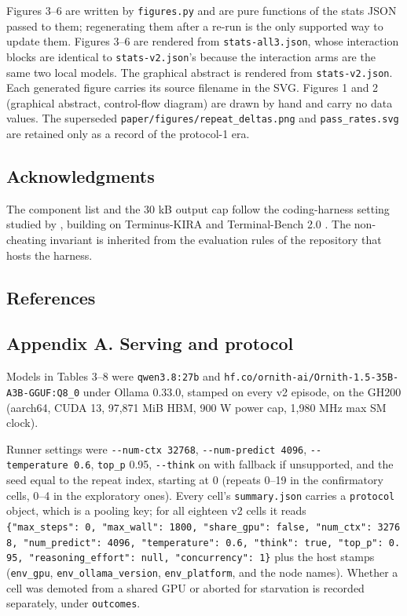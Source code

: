 \documentclass[
  10pt,
  a4paper,
]{article}
\let\oldtexttt\texttt
\renewcommand{\texttt}[1]{{\small\oldtexttt{#1}}}
\begin{document}
Figures 3--6 are written by \texttt{figures.py} and are pure functions
of the stats JSON passed to them; regenerating them after a re-run is
the only supported way to update them. Figures 3--6 are rendered from
\texttt{stats-all3.json}, whose interaction blocks are identical to
\texttt{stats-v2.json}'s because the interaction arms are the same two
local models. The graphical abstract is rendered from
\texttt{stats-v2.json}. Each generated figure carries its source
filename in the SVG. Figures 1 and 2 (graphical abstract, control-flow
diagram) are drawn by hand and carry no data values. The superseded
\texttt{paper/figures/repeat\_deltas.png} and \texttt{pass\_rates.svg}
are retained only as a record of the protocol-1 era.

\subsection{Acknowledgments}\label{acknowledgments}

The component list and the 30 kB output cap follow the coding-harness
setting studied by \citet{lee2026metaharness}, building on Terminus-KIRA
\citep{krafton2026kira} and Terminal-Bench 2.0
\citep{merrill2026terminalbench}. The non-cheating invariant is
inherited from the evaluation rules of the repository that hosts the
harness.

\subsection{References}\label{references}

\renewcommand{\bibsection}{}


\subsection{Appendix A. Serving and
protocol}\label{appendix-a.-serving-and-protocol}

Models in Tables 3--8 were \texttt{qwen3.8:27b} and
\texttt{hf.co/ornith-ai/Ornith-1.5-35B-A3B-GGUF:Q8\_0} under Ollama
0.33.0, stamped on every v2 episode, on the GH200 (aarch64, CUDA 13,
97,871 MiB HBM, 900 W power cap, 1,980 MHz max SM clock).

Runner settings were \texttt{-\/-num-ctx\ 32768},
\texttt{-\/-num-predict\ 4096}, \texttt{-\/-temperature\ 0.6},
\texttt{top\_p} 0.95, \texttt{-\/-think} on with fallback if
unsupported, and the seed equal to the repeat index, starting at 0
(repeats 0--19 in the confirmatory cells, 0--4 in the exploratory ones).
Every cell's \texttt{summary.json} carries a \texttt{protocol} object,
which is a pooling key; for all eighteen v2 cells it reads
\texttt{\{"max\_steps":\ 0,\ "max\_wall":\ 1800,\ "share\_gpu":\ false,\ "num\_ctx":\ 32768,\ "num\_predict":\ 4096,\ "temperature":\ 0.6,\ "think":\ true,\ "top\_p":\ 0.95,\ "reasoning\_effort":\ null,\ "concurrency":\ 1\}}
plus the host stamps (\texttt{env\_gpu}, \texttt{env\_ollama\_version},
\texttt{env\_platform}, and the node names). Whether a cell was demoted
from a shared GPU or aborted for starvation is recorded separately,
under \texttt{outcomes}.
\end{document}
